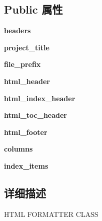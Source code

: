 \subsection*{Public 属性}
\begin{DoxyCompactItemize}
\item 
\mbox{\label{classtohtml_1_1_html_formatter_a4d46721d3370aa612977b691cddacd65}} 
{\bfseries headers}
\item 
\mbox{\label{classtohtml_1_1_html_formatter_a82fc97650919d8b41b9b5a1ea28ca213}} 
{\bfseries project\+\_\+title}
\item 
\mbox{\label{classtohtml_1_1_html_formatter_a4b97e7c421f8c2b9d7ab54b83b83ed84}} 
{\bfseries file\+\_\+prefix}
\item 
\mbox{\label{classtohtml_1_1_html_formatter_a80f222e1509c01e2ba7c9c23d6b78a5c}} 
{\bfseries html\+\_\+header}
\item 
\mbox{\label{classtohtml_1_1_html_formatter_a1d73f98eb628c3b73fdbb09be7eaa43f}} 
{\bfseries html\+\_\+index\+\_\+header}
\item 
\mbox{\label{classtohtml_1_1_html_formatter_a7c70103415276425ba26fc03ce867fd5}} 
{\bfseries html\+\_\+toc\+\_\+header}
\item 
\mbox{\label{classtohtml_1_1_html_formatter_ac82a5868a196d53c2b34b391de6d366b}} 
{\bfseries html\+\_\+footer}
\item 
\mbox{\label{classtohtml_1_1_html_formatter_aeab78a72bc3d583efe9d648494d7a97d}} 
{\bfseries columns}
\item 
\mbox{\label{classtohtml_1_1_html_formatter_af88ba178900fa5fc99d8b6628d9976c7}} 
{\bfseries index\+\_\+items}
\end{DoxyCompactItemize}


\subsection{详细描述}
H\+T\+ML F\+O\+R\+M\+A\+T\+T\+ER C\+L\+A\+SS 

